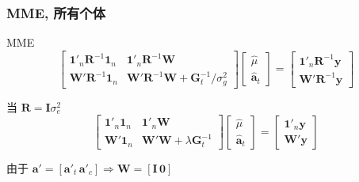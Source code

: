\documentclass[serif,aspectratio=169]{beamer}
\begin{document}
\begin{frame}
  \frametitle{MME, 所有个体}
  \begin{block}{MME}
    $$
    \left[\begin{array}{ll}
        \mathbf{1}'_n\mathbf{R}^{-1}\mathbf{1}_n & \mathbf{1}'_n\mathbf{R}^{-1}\mathbf{W}\\
        \mathbf{W}'\mathbf{R}^{-1}\mathbf{1}_n & \mathbf{W}'\mathbf{R}^{-1}\mathbf{W}+\mathbf{G}^{-1}_t/\sigma_g^2
      \end{array}\right]
    \left[\begin{array}{c}
        \hat{\mu}\\\hat{\mathbf{a}}_t
      \end{array}\right]=
    \left[\begin{array}{c}
        \mathbf{1}'_n\mathbf{R}^{-1}\mathbf{y}\\\mathbf{W}'\mathbf{R}^{-1}\mathbf{y}
      \end{array}\right]
    $$
  \end{block}
  
  \begin{block}{当 $\mathbf{R=I}\sigma_e^2$}
    $$
    \left[\begin{array}{ll}
        \mathbf{1}'_n\mathbf{1}_n & \mathbf{1}'_n\mathbf{W}\\
        \mathbf{W}'\mathbf{1}_n & \mathbf{W'W}+\lambda\mathbf{G}^{-1}_t
      \end{array}\right]
    \left[\begin{array}{c}
        \hat{\mu}\\\hat{\mathbf{a}}_t
      \end{array}\right]=
    \left[\begin{array}{c}
        \mathbf{1}'_n\mathbf{y}\\\mathbf{W}'\mathbf{y}
      \end{array}\right]
    $$

    由于 $\mathbf{a}'=[\mathbf{a}'_t\,\mathbf{a}'_c]\Rightarrow\mathbf{W}=[\mathbf{I\,0}]$
  \end{block}
\end{frame}
\end{document}

